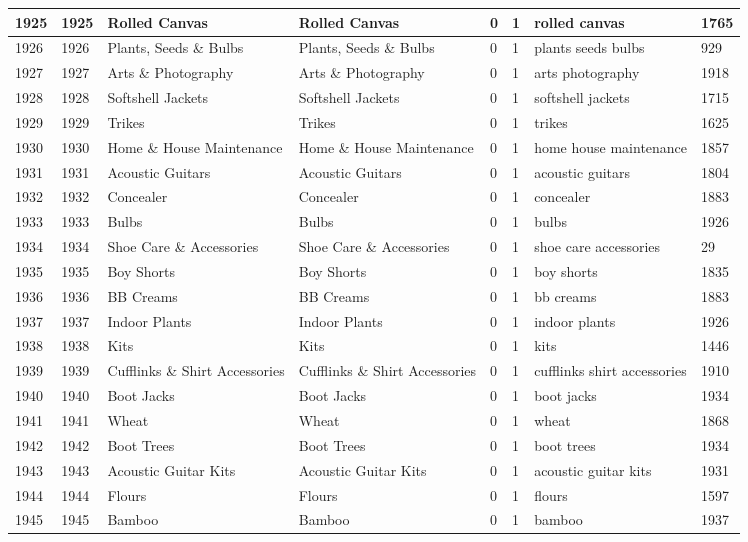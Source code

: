 \begin{longtable}{|l|l|l|l|l|l|l|l|}
1925 & 1925 & Rolled Canvas & Rolled Canvas & 0 & 1 & rolled canvas & 1765 \\ \hline 
1926 & 1926 & Plants, Seeds \& Bulbs & Plants, Seeds \& Bulbs & 0 & 1 & plants seeds bulbs & 929 \\ \hline 
1927 & 1927 & Arts \& Photography & Arts \& Photography & 0 & 1 & arts photography & 1918 \\ \hline 
1928 & 1928 & Softshell Jackets & Softshell Jackets & 0 & 1 & softshell jackets & 1715 \\ \hline 
1929 & 1929 & Trikes & Trikes & 0 & 1 & trikes & 1625 \\ \hline 
1930 & 1930 & Home \& House Maintenance & Home \& House Maintenance & 0 & 1 & home house maintenance & 1857 \\ \hline 
1931 & 1931 & Acoustic Guitars & Acoustic Guitars & 0 & 1 & acoustic guitars & 1804 \\ \hline 
1932 & 1932 & Concealer & Concealer & 0 & 1 & concealer & 1883 \\ \hline 
1933 & 1933 & Bulbs & Bulbs & 0 & 1 & bulbs & 1926 \\ \hline 
1934 & 1934 & Shoe Care \& Accessories & Shoe Care \& Accessories & 0 & 1 & shoe care accessories & 29 \\ \hline 
1935 & 1935 & Boy Shorts & Boy Shorts & 0 & 1 & boy shorts & 1835 \\ \hline 
1936 & 1936 & BB Creams & BB Creams & 0 & 1 & bb creams & 1883 \\ \hline 
1937 & 1937 & Indoor Plants & Indoor Plants & 0 & 1 & indoor plants & 1926 \\ \hline 
1938 & 1938 & Kits & Kits & 0 & 1 & kits & 1446 \\ \hline 
1939 & 1939 & Cufflinks \& Shirt Accessories & Cufflinks \& Shirt Accessories & 0 & 1 & cufflinks shirt accessories & 1910 \\ \hline 
1940 & 1940 & Boot Jacks & Boot Jacks & 0 & 1 & boot jacks & 1934 \\ \hline 
1941 & 1941 & Wheat & Wheat & 0 & 1 & wheat & 1868 \\ \hline 
1942 & 1942 & Boot Trees & Boot Trees & 0 & 1 & boot trees & 1934 \\ \hline 
1943 & 1943 & Acoustic Guitar Kits & Acoustic Guitar Kits & 0 & 1 & acoustic guitar kits & 1931 \\ \hline 
1944 & 1944 & Flours & Flours & 0 & 1 & flours & 1597 \\ \hline 
1945 & 1945 & Bamboo & Bamboo & 0 & 1 & bamboo & 1937 \\ \hline 

\end{longtable}
